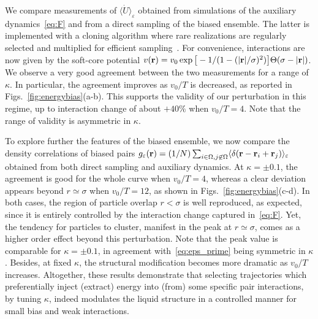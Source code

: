 \documentclass[pre, superscriptaddress, twocolumn,pre]{revtex4-1}
\begin{document}
We compare measurements of $\langle\dot U\rangle_\varepsilon$ obtained from simulations of the auxiliary dynamics~\eqref{eq:F} and from a direct sampling of the biased ensemble. The latter is implemented with a cloning algorithm where rare realizations are regularly selected and multiplied for efficient sampling~\cite{Giadina2006, tailleur2007probing, Hurtado2009, Nemoto2016, Ray2018, Klymko2018, Brewer2018}. For convenience, interactions are now given by the soft-core potential $v({\bf r}) = v_0\exp\big[-1 / (1 - (|{\bf r}|/\sigma)^2)\big]\Theta(\sigma-|{\bf r}|)$. We observe a very good agreement between the two measurements for a range of $\kappa$. In particular, the agreement improves as $v_0/T$ is decreased, as reported in Figs.~\ref{fig:energybias}(a-b). This supports the validity of our perturbation in this regime, up to interaction change of about $+40\%$ when $v_0/T=4$. Note that the range of validity is asymmetric in $\kappa$.


To explore further the features of the biased ensemble, we now compare the density correlations of biased pairs $g_\varepsilon({\bf r})=(1/N) \sum_{i\in\Omega,j\not\in\Omega}\langle \delta({\bf r}-{\bf r}_i+{\bf r}_j)\rangle_\varepsilon$ obtained from both direct sampling and auxiliary dynamics. At $\kappa=\pm0.1$, the agreement is good for the whole curve when $v_0/T=4$, whereas a clear deviation appears beyond $r\simeq\sigma$ when $v_0/T=12$, as shown in Figs.~\ref{fig:energybias}(c-d). In both cases, the region of particle overlap $r<\sigma$ is well reproduced, as expected, since it is entirely controlled by the interaction change captured in~\eqref{eq:F}. Yet, the tendency for particles to cluster, manifest in the peak at $r\simeq\sigma$, comes as a higher order effect beyond this perturbation. Note that the peak value is comparable for $\kappa=\pm0.1$, in agreement with~\eqref{eq:eps_prime} being symmetric in $\kappa$. Besides, at fixed $\kappa$, the structural modification becomes more dramatic as $v_0/T$ increases. Altogether, these results demonstrate that selecting trajectories which preferentially inject (extract) energy into (from) some specific pair interactions, by tuning $\kappa$, indeed modulates the liquid structure in a controlled manner for small bias and weak interactions.
\end{document}
